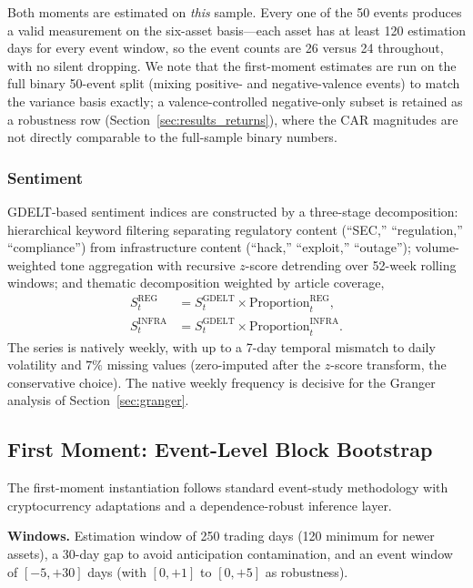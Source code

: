 \documentclass[pdflatex,sn-mathphys-num]{sn-jnl}
\theoremstyle{thmstyleone}
\theoremstyle{thmstyletwo}
\theoremstyle{thmstylethree}
\begin{document}
Both moments are estimated on \emph{this} sample. Every one of the 50 events produces a valid measurement on the six-asset basis---each asset has at least 120 estimation days for every event window, so the event counts are 26 versus 24 throughout, with no silent dropping. We note that the first-moment estimates are run on the full binary 50-event split (mixing positive- and negative-valence events) to match the variance basis exactly; a valence-controlled negative-only subset is retained as a robustness row (Section~\ref{sec:results_returns}), where the CAR magnitudes are not directly comparable to the full-sample binary numbers.

\subsubsection{Sentiment}

GDELT-based sentiment indices are constructed by a three-stage decomposition: hierarchical keyword filtering separating regulatory content (``SEC,'' ``regulation,'' ``compliance'') from infrastructure content (``hack,'' ``exploit,'' ``outage''); volume-weighted tone aggregation with recursive $z$-score detrending over 52-week rolling windows; and thematic decomposition weighted by article coverage,
\begin{align}
S_t^{\text{REG}} &= S_t^{\text{GDELT}} \times \text{Proportion}_t^{\text{REG}}, \\
S_t^{\text{INFRA}} &= S_t^{\text{GDELT}} \times \text{Proportion}_t^{\text{INFRA}}.
\end{align}
The series is natively weekly, with up to a 7-day temporal mismatch to daily volatility and $7\%$ missing values (zero-imputed after the $z$-score transform, the conservative choice). The native weekly frequency is decisive for the Granger analysis of Section~\ref{sec:granger}.

\subsection{First Moment: Event-Level Block Bootstrap}\label{sec:methods_returns}

The first-moment instantiation follows standard event-study methodology \citep{mackinlay1997, kothari2007econometrics} with cryptocurrency adaptations and a dependence-robust inference layer.

\textbf{Windows.} Estimation window of 250 trading days (120 minimum for newer assets), a 30-day gap to avoid anticipation contamination, and an event window of $[-5,+30]$ days (with $[0,+1]$ to $[0,+5]$ as robustness).
\end{document}
